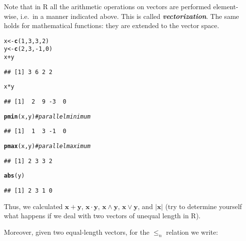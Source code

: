 \documentclass[11pt]{article}\usepackage[]{graphicx}\usepackage[]{color}
\makeatletter
\newcommand{\hlnum}[1]{\textcolor[rgb]{0.686,0.059,0.569}{#1}}%
\newcommand{\hlcom}[1]{\textcolor[rgb]{0.678,0.584,0.686}{\textit{#1}}}%
\newcommand{\hlopt}[1]{\textcolor[rgb]{0,0,0}{#1}}%
\newcommand{\hlstd}[1]{\textcolor[rgb]{0.345,0.345,0.345}{#1}}%
\newcommand{\hlkwb}[1]{\textcolor[rgb]{0.69,0.353,0.396}{#1}}%
\newcommand{\hlkwd}[1]{\textcolor[rgb]{0.737,0.353,0.396}{\textbf{#1}}}%
\newenvironment{kframe}{%
 \def\at@end@of@kframe{}%
 \ifinner\ifhmode%
  \def\at@end@of@kframe{\end{minipage}}%
  \begin{minipage}{\columnwidth}%
 \fi\fi%
 \def\FrameCommand##1{\hskip\@totalleftmargin \hskip-\fboxsep
 \colorbox{shadecolor}{##1}\hskip-\fboxsep
     \hskip-\linewidth \hskip-\@totalleftmargin \hskip\columnwidth}%
 \MakeFramed {\advance\hsize-\width
   \@totalleftmargin\z@ \linewidth\hsize
   \@setminipage}}%
 {\par\unskip\endMakeFramed%
 \at@end@of@kframe}
\newenvironment{knitrout}{}{} %
\renewcommand{\emph}[1]{\textbf{\textsl{#1}}}
\newcommand{\lang}[1]{\textsf{#1}\xspace}
\newcommand{\R}{\lang{R}}
\newcommand{\vect}[1]{{\mathbf{#1}}}
\theoremstyle{remark}
\theoremstyle{definition}
\makeatother
\begin{document}
Note that in \R{} all the arithmetic operations on vectors are
performed element-wise, i.e.~in a manner indicated above.
This is called \emph{vectorization}.
The same holds for mathematical functions: they are extended to the vector space.

\begin{knitrout}\small
{}\color{fgcolor}\begin{kframe}
\begin{alltt}
\hlstd{x} \hlkwb{<-} \hlkwd{c}\hlstd{(}\hlnum{1}\hlstd{,} \hlnum{3}\hlstd{,}  \hlnum{3}\hlstd{,} \hlnum{2}\hlstd{)}
\hlstd{y} \hlkwb{<-} \hlkwd{c}\hlstd{(}\hlnum{2}\hlstd{,} \hlnum{3}\hlstd{,} \hlopt{-}\hlnum{1}\hlstd{,} \hlnum{0}\hlstd{)}
\hlstd{x}\hlopt{+}\hlstd{y}
\end{alltt}
\begin{verbatim}
## [1] 3 6 2 2
\end{verbatim}
\begin{alltt}
\hlstd{x}\hlopt{*}\hlstd{y}
\end{alltt}
\begin{verbatim}
## [1]  2  9 -3  0
\end{verbatim}
\begin{alltt}
\hlkwd{pmin}\hlstd{(x,y)} \hlcom{# parallel minimum}
\end{alltt}
\begin{verbatim}
## [1]  1  3 -1  0
\end{verbatim}
\begin{alltt}
\hlkwd{pmax}\hlstd{(x,y)} \hlcom{# parallel maximum}
\end{alltt}
\begin{verbatim}
## [1] 2 3 3 2
\end{verbatim}
\begin{alltt}
\hlkwd{abs}\hlstd{(y)}
\end{alltt}
\begin{verbatim}
## [1] 2 3 1 0
\end{verbatim}
\end{kframe}
\end{knitrout}

\noindent
Thus, we calculated $\vect{x}+\vect{y}$,
$\vect{x}\cdot\vect{y}$, $\vect{x}\wedge\vect{y}$, $\vect{x}\vee\vect{y}$,
and $|\vect{x}|$
(try to determine yourself what happens if we deal
with two vectors of unequal length in \R).

Moreover, given two equal-length vectors,
for the $\le_n$ relation we write:
\end{document}
